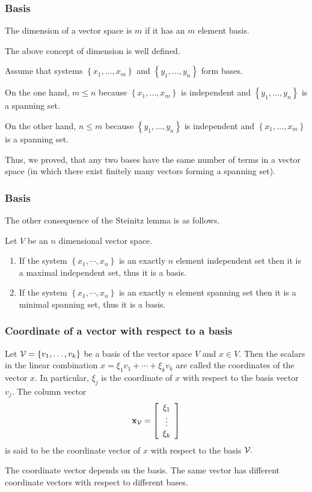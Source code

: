 \begin{frame}\frametitle{Basis}
\begin{definition}
The dimension of a vector space is $m$ if it has an $m$ element basis.
\end{definition}
The above concept of dimension is well defined.

Assume that systems $\left\{ x_1,\ldots,x_m \right\}$ and $\left\{ y_1,\ldots,y_n \right\}$ form bases.

On the one hand, $m\leq n$ because $\left\{ x_1,\ldots,x_m \right\}$ is independent and $\left\{ y_1,\ldots,y_n \right\}$ is a spanning set.

On the other hand, $n\leq m$ because $\left\{ y_1,\ldots,y_n \right\}$ is independent and $\left\{ x_1,\ldots,x_m \right\}$ is a spanning set.

Thus, we proved, that
\alert{any two bases have the same number of terms in a vector space}
(in which there exist finitely many vectors forming a spanning set).
\end{frame}

\begin{frame}\frametitle{Basis}
    The other consequence of the Steinitz lemma is as follows.
    \begin{proposition}
        Let $V$ be an $n$ dimensional vector space.
        \begin{enumerate}
            \item If the system $\left\{x_1,\cdots,x_n \right\}$ is an exactly $n$ element independent set
                then it is a maximal independent set, thus it is a basis.
            \item If the system $\left\{x_1,\cdots,x_n \right\}$ is an exactly $n$ element spanning set
                then it is a minimal spanning set, thus it is a basis.
        \end{enumerate}
    \end{proposition}
\end{frame}
%

\begin{frame}\frametitle{Coordinate of a vector with respect to a basis}
\begin{definition}
Let ${\cal V}=\{v_1,\ldots ,v_k\}$ be a basis of the vector space $V$ and $x\in V.$ Then the scalars in the linear combination $x=\xi_1v_1+\cdots +\xi_kv_k$ are called the coordinates of the vector $x.$ In particular, $\xi_j$ is the coordinate of $x$ with respect to the basis vector $v_j.$ The column vector 
$$\mathbf{x}_{\cal V}=\left[\begin{array}{c}
\xi_1\\
\vdots \\
\xi_k
\end{array}\right]$$
is said to be the coordinate vector of $x$ with respect to the basis ${\cal V}.$
\end{definition}

The coordinate vector depends on the basis. The same vector has different coordinate vectors with respect to different bases.
\end{frame}
